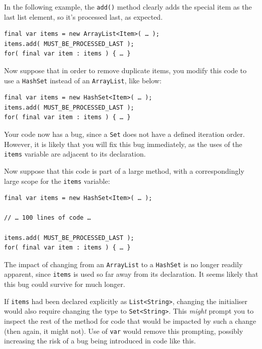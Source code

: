 In the following example, the \lstinline|add()| method clearly adds the special item as the last list element, so it’s processed last, as expected.
\begin{lstlisting}
final var items = new ArrayList<Item>( … );
items.add( MUST_BE_PROCESSED_LAST );
for( final var item : items ) { … }
\end{lstlisting}

Now suppose that in order to remove duplicate items, you modify this code to use a \lstinline|HashSet|\autocite{ORACLE_DOC_HASHSET_CLASS} instead of an \lstinline|ArrayList|\autocite{ORACLE_DOC_ARRAYLIST_CLASS}, like below:
\begin{lstlisting}
final var items = new HashSet<Item>( … );
items.add( MUST_BE_PROCESSED_LAST );
for( final var item : items ) { … }
\end{lstlisting}

Your code now has a bug, since a \lstinline|Set| does not have a defined iteration order. However, it is likely that you will fix this bug immediately, as the uses of the \lstinline|items| variable are adjacent to its declaration.

Now suppose that this code is part of a large method, with a correspondingly large scope for the \lstinline|items| variable:
\begin{lstlisting}
final var items = new HashSet<Item>( … );

// … 100 lines of code …

items.add( MUST_BE_PROCESSED_LAST );
for( final var item : items ) { … }
\end{lstlisting}

The impact of changing from an \lstinline|ArrayList| to a \lstinline|HashSet| is no longer readily apparent, since \lstinline|items| is used so far away from its declaration. It seems likely that this bug could survive for much longer.

If \lstinline|items| had been declared explicitly as \lstinline|List<String>|, changing the initialiser would also require changing the type to \lstinline|Set<String>|. This \textit{might} prompt you to inspect the rest of the method for code that would be impacted by such a change (then again, it might not). Use of \lstinline|var| would remove this prompting, possibly increasing the risk of a bug being introduced in code like this.

